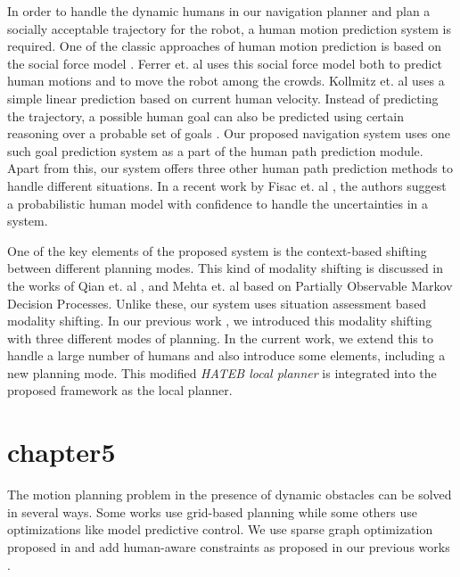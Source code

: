In order to handle the dynamic humans in our navigation planner and plan a socially acceptable trajectory for the robot, a human motion prediction system is required. One of the classic approaches of human motion prediction is based on the social force model \cite{helbing1995social}. Ferrer et. al \cite{ferrer2015multi} uses this social force model both to predict human motions and to move the robot among the crowds. Kollmitz et. al \cite{kollmitz_time_2015} uses a simple linear prediction based on current human velocity. Instead of predicting the trajectory, a possible human goal can also be predicted using certain reasoning over a probable set of goals \cite{bordallo2015counterfactual}. Our proposed navigation system uses one such goal prediction system \cite{ferrer2014bayesian} as a part of the human path prediction module. Apart from this, our system offers three other human path prediction methods to handle different situations. In a recent work by Fisac et. al \cite{fisac2018probabilistically}, the authors suggest a probabilistic human model with confidence to handle the uncertainties in a system.

One of the key elements of the proposed system is the context-based shifting between different planning modes. This kind of modality shifting is discussed in the works of Qian et. al \cite{qian_decision-theoretical_2013}, and Mehta et. al \cite{mehta_autonomous_2016} based on Partially Observable Markov Decision Processes. Unlike these, our system uses situation assessment based modality shifting. In our previous work \cite{singamaneni2020hateb}, we introduced this modality shifting with three different modes of planning. In the current work, we extend this to handle a large number of humans and also introduce some elements, including a new planning mode. This modified \textit{HATEB local planner} is integrated into the proposed framework as the local planner.
\section{chapter5}
The motion planning problem in the presence of dynamic obstacles can be solved in several ways. Some works use grid-based planning \cite{kollmitz2015time, phillips2011sipp} while some others \cite{schoels2020nmpc, rosmann2021online} use optimizations like model predictive control. We use sparse graph optimization proposed in \cite{rosmann2013efficient} and add human-aware constraints as proposed in our previous works \cite{khambhaita2017viewing, singamanenihateb2020, singamaneni2021human}.

